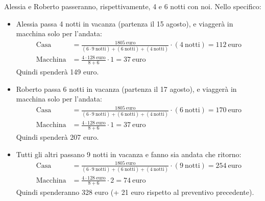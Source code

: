 \documentclass[8pt]{beamer}
\begin{document}
\begin{frame}[label={sec:org62086e4}]{Alessia e Roberto passeranno, rispettivamente, 4 e 6 notti con noi.}
Nello specifico:
\begin{itemize}
\item \alert{Alessia} passa 4 notti in vacanza (partenza il 15 agosto), e viaggerà in macchina solo per l'andata:
\begin{align*}
  \text{Casa} &= \frac{1805\ \text{euro}}{(6 \cdot 9\ \text{notti}) + (6\ \text{notti}) + (4\ \text{notti})} \cdot (4\ \text{notti}) =  112\ \text{euro}\\[2ex]
  \text{Macchina} &= \frac{4\cdot 128\ \text{euro}}{8 + 6} \cdot 1 = 37\ \text{euro}
\end{align*}
Quindi spenderà \alert{149 euro}.
\item \alert{Roberto} passa 6 notti in vacanza (partenza il 17 agosto), e viaggerà in macchina solo per l'andata:
\begin{align*}
  \text{Casa} &= \frac{1805\ \text{euro}}{(6 \cdot 9\ \text{notti}) + (6\ \text{notti}) + (4\ \text{notti})} \cdot (6\ \text{notti}) = 170\ \text{euro} \\[2ex]
  \text{Macchina} &= \frac{4\cdot 128\ \text{euro}}{8 + 6} \cdot 1 = 37\ \text{euro}
\end{align*}
Quindi spenderà \alert{207 euro}.
\item \alert{Tutti gli altri} passano 9 notti in vacanza e fanno sia andata che ritorno:
\begin{align*}
  \text{Casa} &= \frac{1805\ \text{euro}}{(6 \cdot 9\ \text{notti}) + (6\ \text{notti}) + (4\ \text{notti})} \cdot (9\ \text{notti}) = 254\ \text{euro}\\[2ex]
  \text{Macchina} &= \frac{4\cdot 128\ \text{euro}}{8 + 6} \cdot 2 = 74\ \text{euro}
\end{align*}
Quindi spenderanno \alert{328 euro} (+ 21 euro rispetto al preventivo precedente).
\end{itemize}
\end{frame}
\end{document}
